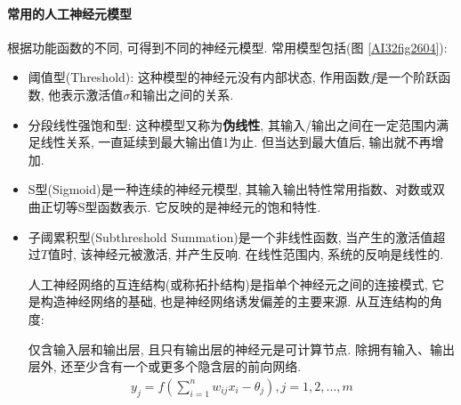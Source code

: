 \paragraph{常用的人工神经元模型}
根据功能函数的不同, 可得到不同的神经元模型. 常用模型包括(图 \ref{AI32fig2604}):
\begin{itemize}
\item 阈值型(Threshold): 这种模型的神经元没有内部状态, 作用函数$f$是一个阶跃函数, 他表示激活值$\sigma$和输出之间的关系.
\item 分段线性强饱和型: 这种模型又称为\textbf{伪线性}, 其输入/输出之间在一定范围内满足线性关系, 一直延续到最大输出值1为止. 但当达到最大值后, 输出就不再增加.
\item S型(Sigmoid)是一种连续的神经元模型, 其输入输出特性常用指数、对数或双曲正切等S型函数表示. 它反映的是神经元的饱和特性.

\item 子阈累积型(Subthreshold Summation)是一个非线性函数, 当产生的激活值超过$T$值时, 该神经元被激活, 并产生反响. 在线性范围内, 系统的反响是线性的.

人工神经网络的互连结构(或称拓扑结构)是指单个神经元之间的连接模式, 它是构造神经网络的基础, 也是神经网络诱发偏差的主要来源. 从互连结构的角度:

仅含输入层和输出层, 且只有输出层的神经元是可计算节点. 除拥有输入、输出层外, 还至少含有一个或更多个隐含层的前向网络.
\begin{align}
    {y}_{{j}}={f}\left(\sum_{{i}=1}^{{n}} w_{{ij}} {x}_{{i}}-\theta_{{j}}\right), {j}=1,2, \ldots, {m}
\end{align}
\end{itemize}
